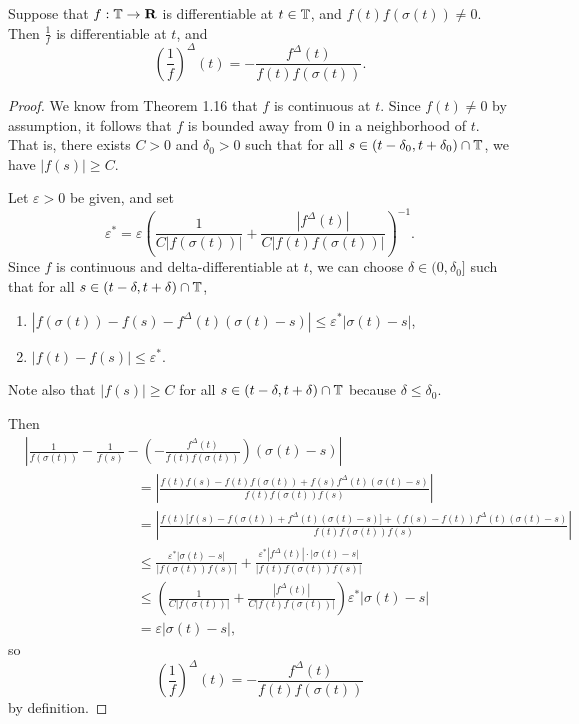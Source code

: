\documentclass[nonumber]{homework}
\begin{document}
	Suppose that $f : \mathbb{T} \to \textnormal{\bf R}$ is differentiable at $t \in \mathbb{T}$, and $f(t)f(\sigma(t)) \ne 0$. Then $\frac{1}{f}$ is differentiable at $t$, and
	\begin{equation*}
		\left(\frac{1}{f}\right)^\Delta(t) = -\frac{f^\Delta(t)}{f(t)f(\sigma(t))}.
	\end{equation*}
	\begin{proof}
		We know from Theorem 1.16 that $f$ is continuous at $t$. Since $f(t) \ne 0$ by assumption, it follows that $f$ is bounded away from 0 in a neighborhood of $t$. That is, there exists $C > 0$ and $\delta_0 > 0$ such that for all $s \in (t-\delta_0, t+\delta_0)\cap \mathbb{T}$, we have $|f(s)| \ge C$.
		
		Let $\varepsilon > 0$ be given, and set 
		\begin{equation*}
			\varepsilon^*= \varepsilon\left(\frac{1}{C|f(\sigma(t))|} + \frac{\left|f^\Delta(t)\right|}{C\big|f(t)f(\sigma(t))\big|}\right)^{-1}.
		\end{equation*}
		Since $f$ is continuous and delta-differentiable at $t$, we can choose $\delta  \in (0, \delta_0]$ such that for all $s \in (t-\delta, t+\delta) \cap \mathbb{T}$,
		\begin{enumerate}
			\item $|f(\sigma(t)) - f(s) - f^\Delta(t)(\sigma(t) - s)| \le \varepsilon^* |\sigma(t) - s|$,
			\item $|f(t) - f(s)| \le \varepsilon^*$.
		\end{enumerate}
		Note also that $|f(s)| \ge C$ for all $s \in (t-\delta, t+\delta)\cap\mathbb{T}$ because $\delta \le \delta_0$.
		
		Then
		\begin{align*}
			&\left|\frac{1}{f(\sigma(t))} - \frac{1}{f(s)} - \left(-\frac{f^\Delta(t)}{f(t)f(\sigma(t))}\right)(\sigma(t) - s)\right|\\[0.5em]
			&\qquad\qquad\qquad\qquad= \left|\frac{f(t)f(s) - f(t)f(\sigma(t)) + f(s)f^\Delta(t)(\sigma(t)-s)}{f(t)f(\sigma(t))f(s)}\right| \\[0.5em]
			&\qquad\qquad\qquad\qquad= \left|\frac{f(t)\big[f(s) - f(\sigma(t)) + f^\Delta(t)(\sigma(t)-s)\big] + (f(s) - f(t))f^\Delta(t)(\sigma(t) - s)}{f(t)f(\sigma(t))f(s)}\right| \\[0.5em]
			&\qquad\qquad\qquad\qquad \le \frac{\varepsilon^*|\sigma(t)-s|}{\big|f(\sigma(t))f(s)|} + \frac{\varepsilon^*\left|f^\Delta(t)\right|\cdot|\sigma(t)-s|}{\big|f(t)f(\sigma(t))f(s)\big|} \\[0.5em]
			&\qquad\qquad\qquad\qquad \le \left(\frac{1}{C|f(\sigma(t))|} + \frac{\left|f^\Delta(t)\right|}{C\big|f(t)f(\sigma(t))\big|}\right)\varepsilon^*|\sigma(t)-s| \\[0.5em]
			&\qquad\qquad\qquad\qquad = \varepsilon|\sigma(t)-s|,
		\end{align*}
		so
		\begin{equation*}
			\left(\frac{1}{f}\right)^\Delta(t) = -\frac{f^\Delta(t)}{f(t)f(\sigma(t))}
		\end{equation*}
		by definition.
	\end{proof}
	
\end{document}
